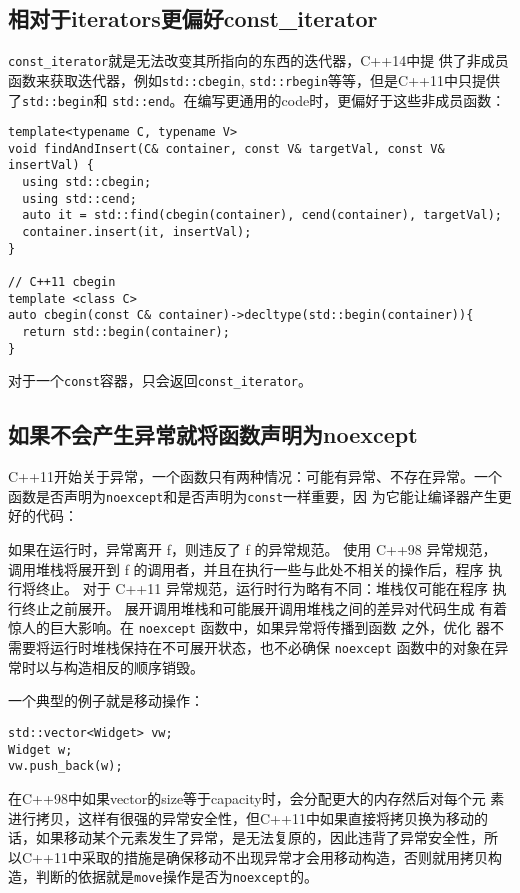\subsection{相对于iterators更偏好const\_iterator}
\label{sec:Item2-13}

\texttt{const\_iterator}就是无法改变其所指向的东西的迭代器，C++14中提
供了非成员函数来获取迭代器，例如\texttt{std::cbegin},
\texttt{std::rbegin}等等，但是C++11中只提供了\texttt{std::begin}和
\texttt{std::end}。在编写更通用的code时，更偏好于这些非成员函数：
\begin{verbatim}
template<typename C, typename V>
void findAndInsert(C& container, const V& targetVal, const V& insertVal) { 
  using std::cbegin; 
  using std::cend;
  auto it = std::find(cbegin(container), cend(container), targetVal);
  container.insert(it, insertVal);
}

// C++11 cbegin
template <class C>
auto cbegin(const C& container)->decltype(std::begin(container)){
  return std::begin(container);
}
\end{verbatim}
对于一个\texttt{const}容器，只会返回\texttt{const\_iterator}。

\subsection{如果不会产生异常就将函数声明为noexcept}
\label{sec:Item2-14}

C++11开始关于异常，一个函数只有两种情况：可能有异常、不存在异常。一个
函数是否声明为\texttt{noexcept}和是否声明为\texttt{const}一样重要，因
为它能让编译器产生更好的代码：

如果在运行时，异常离开 f，则违反了 f 的异常规范。 使用 C++98 异常规范，
调用堆栈将展开到 f 的调用者，并且在执行一些与此处不相关的操作后，程序
执行将终止。 对于 C++11 异常规范，运行时行为略有不同：堆栈仅可能在程序
执行终止之前展开。 展开调用堆栈和可能展开调用堆栈之间的差异对代码生成
有着惊人的巨大影响。在 \texttt{noexcept} 函数中，如果异常将传播到函数
之外，优化 器不需要将运行时堆栈保持在不可展开状态，也不必确保
\texttt{noexcept} 函数中的对象在异常时以与构造相反的顺序销毁。

一个典型的例子就是移动操作：
\begin{verbatim}
std::vector<Widget> vw;
Widget w;
vw.push_back(w);
\end{verbatim}
在C++98中如果vector的size等于capacity时，会分配更大的内存然后对每个元
素进行拷贝，这样有很强的异常安全性，但C++11中如果直接将拷贝换为移动的
话，如果移动某个元素发生了异常，是无法复原的，因此违背了异常安全性，所
以C++11中采取的措施是确保移动不出现异常才会用移动构造，否则就用拷贝构
造，判断的依据就是\texttt{move}操作是否为\texttt{noexcept}的。

